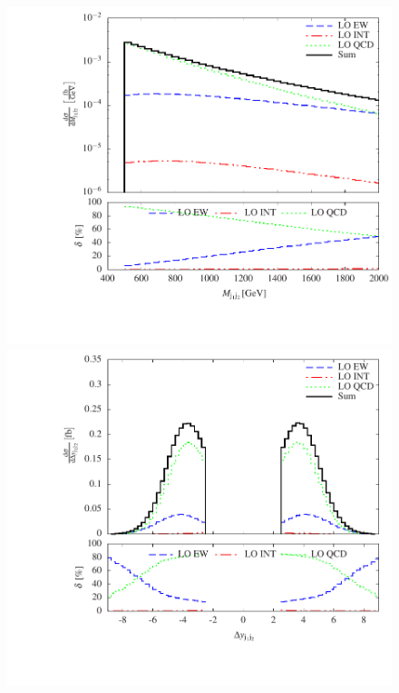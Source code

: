 \documentclass[11pt]{cernrep}
\begin{document}
\begin{figure}[htbp]
\begin{center}
   \includegraphics[scale=0.5]{figs/histogram_invariant_mass_mjj12}
   \includegraphics[scale=0.5]{figs/histogram_rapidity_separation_j1j2}

\end{center}
\end{figure}
\end{document}
